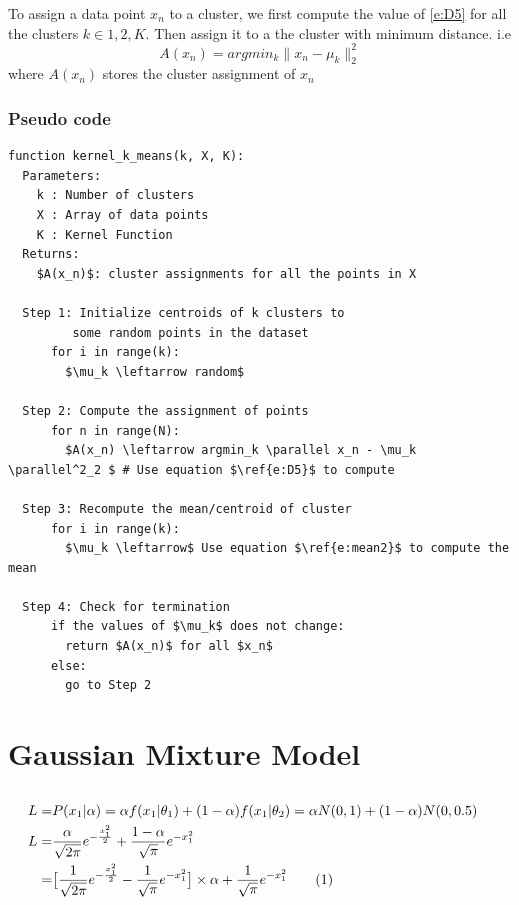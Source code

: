 \documentclass[a4paper,doc,notimes]{article}
\newcommand\numberthis{\addtocounter{equation}{1}\tag{\theequation}}
\begin{document}
\subsubsection{}
To assign a data point $x_n$ to a cluster, we first compute the value of \ref{e:D5} for all the clusters $k \in 1, 2, K$. Then assign it to a the cluster with minimum distance. i.e
\begin{equation}\label{e:asgn}
	A(x_n) = argmin_k \parallel x_n - \mu_k \parallel^2_2 
\end{equation}
where $A(x_n)$ stores the cluster assignment of $x_n$

\subsubsection{Pseudo code}
\begin{lstlisting}[mathescape=true]
function kernel_k_means(k, X, K):
  Parameters:
    k : Number of clusters
    X : Array of data points
    K : Kernel Function
  Returns:
    $A(x_n)$: cluster assignments for all the points in X

  Step 1: Initialize centroids of k clusters to
         some random points in the dataset
      for i in range(k):
        $\mu_k \leftarrow random$

  Step 2: Compute the assignment of points
      for n in range(N):
        $A(x_n) \leftarrow argmin_k \parallel x_n - \mu_k \parallel^2_2 $ # Use equation $\ref{e:D5}$ to compute

  Step 3: Recompute the mean/centroid of cluster
      for i in range(k):
        $\mu_k \leftarrow$ Use equation $\ref{e:mean2}$ to compute the mean
  
  Step 4: Check for termination
      if the values of $\mu_k$ does not change:
        return $A(x_n)$ for all $x_n$
      else:
        go to Step 2
\end{lstlisting}
\section{Gaussian Mixture Model}
\subsection{}

\begin{align*}
L = & P(x_1|\alpha) = \alpha f(x_1|\theta_1) + (1 - \alpha) f(x_1|\theta_2) = \alpha N(0, 1) + (1 - \alpha) N(0, 0.5)  & \\
L = & \frac{\alpha}{\sqrt{2 \pi}} e^{-\frac{x_1^2}{2}} + \frac{1 - \alpha}{\sqrt{\pi}} e^{-x_1^2} & \\
= & \big[\frac{1}{\sqrt{2 \pi}} e^{-\frac{x_1^2}{2}} - \frac{1}{\sqrt{\pi}} e^{-x_1^2} \big] \times \alpha + \frac{1}{\sqrt{\pi}} e^{-x_1^2} \numberthis \label{e:2a1} &  \\
\end{align*}
\end{document}
